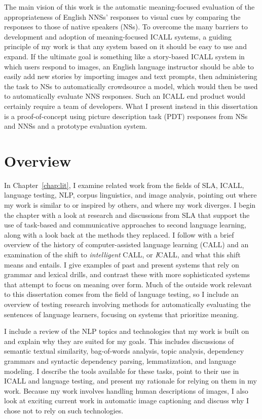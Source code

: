 The main vision of this work is the automatic meaning-focused evaluation of the appropriateness of English NNSs' responses to visual cues by comparing the responses to those of native speakers (NSs).
To overcome the many barriers to development and adoption of meaning-focused ICALL systems, a guiding principle of my work is that any system based on it should be easy to use and expand. If the ultimate goal is something like a story-based ICALL system in which users respond to images, an English language instructor should be able to easily add new stories by importing images and text prompts, then administering the task to NSs to automatically crowdsource a model, which would then be used to automatically evaluate NNS responses. Such an ICALL end product would certainly require a team of developers. What I present instead in this dissertation is a proof-of-concept using picture description task (PDT) responses from NSs and NNSs and a prototype evaluation system.

\section{Overview}
\label{sec:overview}


In Chapter~\ref{chap:lit}, I examine related work from the fields of SLA, ICALL, language testing, NLP, corpus linguistics, and image analysis, pointing out where my work is similar to or inspired by others, and where my work diverges. I begin the chapter with a look at research and discussions from SLA that support the use of task-based and communicative approaches to second language learning, along with a look back at the methods they replaced. I follow with a brief overview of the history of computer-assisted language learning (CALL) and an examination of the shift to \textit{intelligent} CALL, or \textit{I}CALL, and what this shift means and entails. I give examples of past and present systems that rely on grammar and lexical drills, and contrast these with more sophisticated systems that attempt to focus on meaning over form. Much of the outside work relevant to this dissertation comes from the field of language testing, so I include an overview of testing research involving methods for automatically evaluating the sentences of language learners, focusing on systems that prioritize meaning.

I include a review of the NLP topics and technologies that my work is built on and explain why they are suited for my goals. This includes discussions of semantic textual similarity, bag-of-words analysis, topic analysis, dependency grammars and syntactic dependency parsing, lemmatization, and language modeling. I describe the tools available for these tasks, point to their use in ICALL and language testing, and present my rationale for relying on them in my work. Because my work involves handling human descriptions of images, I also look at exciting current work in automatic image captioning and discuss why I chose not to rely on such technologies.

